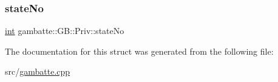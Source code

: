 \mbox{\label{structgambatte_1_1GB_1_1Priv_ae942db4bbe5234a0ae60abf44be98357}} 
\subsubsection{\texorpdfstring{state\+No}{stateNo}}
{\footnotesize\ttfamily \hyperlink{ioapi_8h_a787fa3cf048117ba7123753c1e74fcd6}{int} gambatte\+::\+G\+B\+::\+Priv\+::state\+No}



The documentation for this struct was generated from the following file\+:\begin{DoxyCompactItemize}
\item 
src/\hyperlink{gambatte_8cpp}{gambatte.\+cpp}\end{DoxyCompactItemize}
